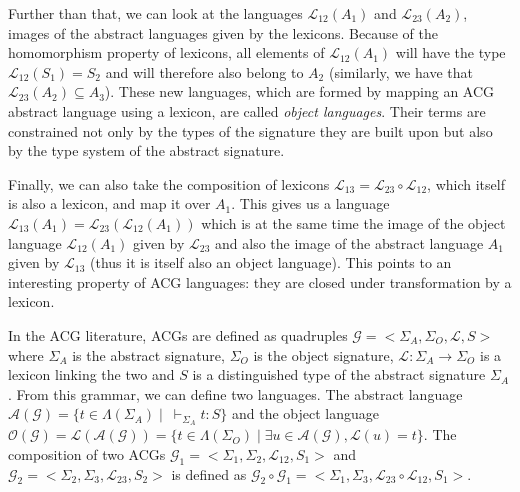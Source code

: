 Further than that, we can look at the languages $\mathcal{L}_{12}(A_1)$
and $\mathcal{L}_{23}(A_2)$, images of the abstract languages given by
the lexicons. Because of the homomorphism property of lexicons, all
elements of $\mathcal{L}_{12}(A_1)$ will have the type
$\mathcal{L}_{12}(S_1) = S_2$ and will therefore also belong to $A_2$
(similarly, we have that $\mathcal{L}_{23}(A_2) \subseteq A_3$). These
new languages, which are formed by mapping an ACG abstract language
using a lexicon, are called \emph{object languages}. Their terms are
constrained not only by the types of the signature they are built upon
but also by the type system of the abstract signature.

Finally, we can also take the composition of lexicons $\mathcal{L}_{13}
= \mathcal{L}_{23} \circ \mathcal{L}_{12}$, which itself is also a
lexicon, and map it over $A_1$. This gives us a language
$\mathcal{L}_{13}(A_1) = \mathcal{L}_{23}(\mathcal{L}_{12}(A_1))$ which
is at the same time the image of the object language
$\mathcal{L}_{12}(A_1)$ given by $\mathcal{L}_{23}$ and also the image
of the abstract language $A_1$ given by $\mathcal{L}_{13}$ (thus it is
itself also an object language). This points to an interesting property
of ACG languages: they are closed under transformation by a lexicon.

In the ACG literature, ACGs are defined as quadruples $\mathcal{G} =
\mathopen{<}\Sigma_A, \Sigma_O, \mathcal{L}, S\mathclose{>}$ where
$\Sigma_A$ is the abstract signature, $\Sigma_O$ is the object
signature, $\mathcal{L} : \Sigma_A \to \Sigma_O$ is a lexicon linking
the two and $S$ is a distinguished type of the abstract signature
$\Sigma_A$. From this grammar, we can define two languages. The abstract
language $\mathcal{A}(\mathcal{G}) = \{t \in \Lambda(\Sigma_A) \mid
\ \vdash_{\Sigma_A} t : S\}$ and the object language
$\mathcal{O}(\mathcal{G}) = \mathcal{L}(\mathcal{A}(\mathcal{G})) = \{t
\in \Lambda(\Sigma_O) \mid \exists u \in \mathcal{A}(\mathcal{G}),
\mathcal{L}(u) = t\}$. The composition of two ACGs $\mathcal{G}_1 =
\mathopen{<}\Sigma_1, \Sigma_2, \mathcal{L}_{12}, S_1\mathclose{>}$ and
$\mathcal{G}_2 = \mathopen{<}\Sigma_2, \Sigma_3, \mathcal{L}_{23},
S_2\mathclose{>}$ is defined as $\mathcal{G}_2 \circ \mathcal{G}_1 =
\mathopen{<}\Sigma_1, \Sigma_3, \mathcal{L}_{23} \circ \mathcal{L}_{12},
S_1\mathclose{>}$.

